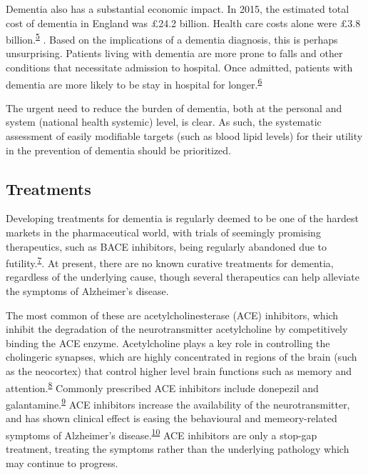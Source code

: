 \documentclass[a4paper, twoside]{templates/ociamthesis}
\begin{document}
Dementia also has a substantial economic impact. In 2015, the estimated total cost of dementia in England was £24.2 billion. Health care costs alone were £3.8 billion.\textsuperscript{\protect\hyperlink{ref-wittenberg2019}{5}} . Based on the implications of a dementia diagnosis, this is perhaps unsurprising. Patients living with dementia are more prone to falls and other conditions that necessitate admission to hospital. Once admitted, patients with dementia are more likely to be stay in hospital for longer.\textsuperscript{\protect\hyperlink{ref-mollers2019}{6}}

The urgent need to reduce the burden of dementia, both at the personal and system (national health systemic) level, is clear. As such, the systematic assessment of easily modifiable targets (such as blood lipid levels) for their utility in the prevention of dementia should be prioritized.

\hypertarget{treatments}{%
\subsection{Treatments}\label{treatments}}

Developing treatments for dementia is regularly deemed to be one of the hardest markets in the pharmaceutical world, with trials of seemingly promising therapeutics, such as BACE inhibitors, being regularly abandoned due to futility.\textsuperscript{\protect\hyperlink{ref-cummings2020}{7}}. At present, there are no known curative treatments for dementia, regardless of the underlying cause, though several therapeutics can help alleviate the symptoms of Alzheimer's disease.

The most common of these are acetylcholinesterase (ACE) inhibitors, which inhibit the degradation of the neurotransmitter acetylcholine by competitively binding the ACE enzyme. Acetylcholine plays a key role in controlling the cholingeric synapses, which are highly concentrated in regions of the brain (such as the neocortex) that control higher level brain functions such as memory and attention.\textsuperscript{\protect\hyperlink{ref-hampel2018}{8}} Commonly prescribed ACE inhibitors include donepezil and galantamine.\textsuperscript{\protect\hyperlink{ref-pariente2008}{9}} ACE inhibitors increase the availability of the neurotransmitter, and has shown clinical effect is easing the behavioural and memeory-related symptoms of Alzheimer's disease.\textsuperscript{\protect\hyperlink{ref-marucci2020}{10}} ACE inhibitors are only a stop-gap treatment, treating the symptoms rather than the underlying pathology which may continue to progress.
\end{document}
